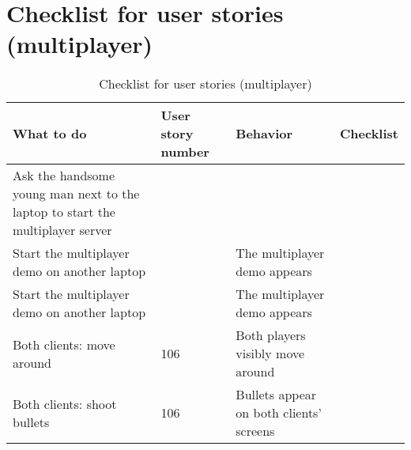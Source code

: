 \documentclass{article}
\begin{document}
\section{Checklist for user stories (multiplayer)}
\begin{table}[H]
    \centering
    \begin{tabular}{|p{3cm}|p{3cm}|p{6cm}|p{3cm}|}
    \hline
    \textbf{What to do} & \textbf{User story number} & \textbf{Behavior} & \textbf{Checklist} \\ \hline
    Ask the handsome young man next to the laptop to start the multiplayer server & & & \\ \hline
    Start the multiplayer demo on another laptop & & The multiplayer demo appears & \\ \hline
    Start the multiplayer demo on another laptop & & The multiplayer demo appears & \\ \hline
    Both clients: move around & 106 & Both players visibly move around & \\ \hline
    Both clients: shoot bullets & 106 & Bullets appear on both clients' screens & \\ \hline
    
    \end{tabular}
    \caption{Checklist for user stories (multiplayer)}
    \label{tab:user_stories}
    \end{table}
\end{document}
